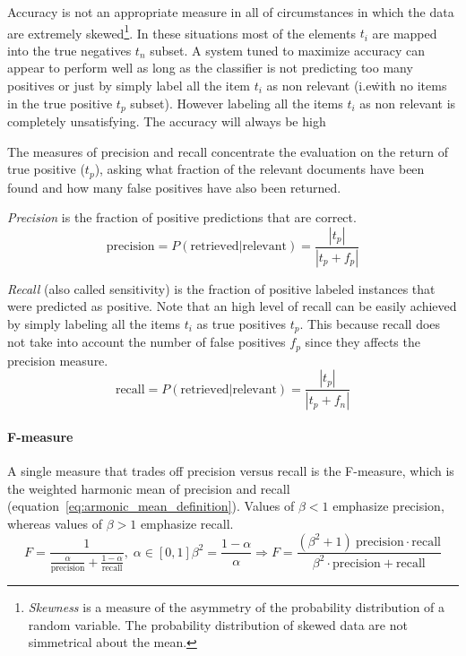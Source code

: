 Accuracy is not an appropriate measure in all of circumstances in which the data are extremely skewed\footnote{\emph{Skewness} is a measure of the asymmetry of the probability distribution of a random variable. The probability distribution of skewed data are not simmetrical about the mean.}. In these situations most of the elements $t_i$ are mapped into the true negatives $t_n$ subset. A system tuned to maximize accuracy can appear to perform well as long as the classifier is not predicting too many positives or just by simply label all the item $t_i$ as non relevant (i.e\. with no items in the true positive $t_p$ subset). However labeling all the items $t_i$ as non relevant is completely unsatisfying. The accuracy will always be high 

The measures of precision and recall concentrate the evaluation on the return of true positive ($t_p$), asking what fraction of the relevant documents have been found and how many false positives have also been returned.

\emph{Precision} is the fraction of positive predictions that are correct.
\begin{equation}
 \mbox{precision} = P(\mbox{retrieved}|\mbox{relevant}) = \frac{|t_p|}{\left|t_p+f_p\right|}
\end{equation}

\emph{Recall} (also called sensitivity) is the fraction of positive labeled instances that were predicted as positive.  Note that an high level of recall can be easily achieved by simply labeling all the items $t_i$ as true positives $t_p$. This because recall does not take into account the number of false positives $f_p$ since they affects the precision measure.
\begin{equation}
 \mbox{recall} = P(\mbox{retrieved|relevant}) = \frac{| t_p |}{| t_p+f_n |}
\end{equation}

\paragraph{F-measure} A single measure that trades off precision versus recall is the F-measure, which is the weighted harmonic mean of precision and recall (equation~\ref{eq:armonic_mean_definition}). Values of $\beta < 1$ emphasize precision, whereas values of $\beta > 1$ emphasize recall.
\begin{subequations}
  \begin{equation}
    F = \frac{1}{\frac{\alpha}{\mbox{precision}}+\frac{1-\alpha}{\mbox{recall}}}, \; \alpha \in [0,1]
  \label{eq:armonic_mean_definition}
  \end{equation}
  \begin{equation}
    \beta^2 =\frac{1-\alpha}{\alpha} \Rightarrow F = \dfrac{(\beta^2+1) \: \mbox{precision} \cdot \mbox{recall}}{\beta^2 \cdot \mbox{precision} + \mbox{recall}}
  \label{eq:fmean_definition}
  \end{equation}
\end{subequations}

